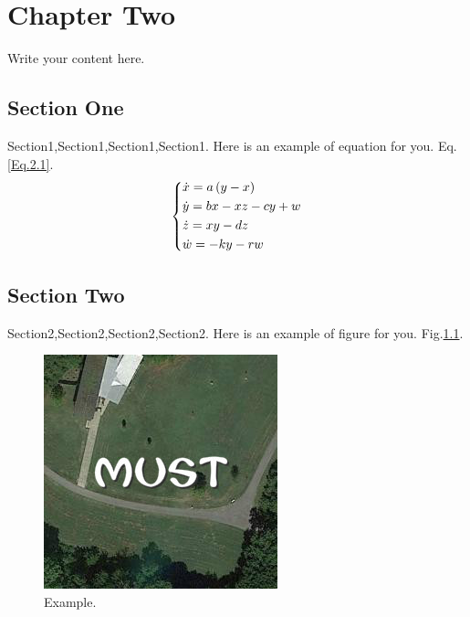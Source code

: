 \pagestyle{fancy}
\lhead{}

\chapter{Chapter Two} \label{cp2}
\thispagestyle{fancy}

Write your content here.

\section{Section One}
Section1,Section1,Section1,Section1. Here is an example of equation for you. Eq.\ref{Eq.2.1}.
\begin{equation}
	\left\{
	\begin{gathered}
		\dot x = a\left( {y - x} \right) \hfill \\
		\dot y = bx - xz - cy + w \hfill \\
		\dot z = xy - dz \hfill \\
		\dot w =  - ky - rw \hfill \\ 
	\end{gathered}
	\right.
	\label{Eq.2.1}
\end{equation}


\section{Section Two}
Section2,Section2,Section2,Section2. Here is an example of figure for you. Fig.\ref{fig.2.1}.
\begin{figure}
	\centering
	\includegraphics[scale=0.6]{Figs/example.jpg}
	\caption{Example.}
	\label{fig.2.1}
\end{figure}

